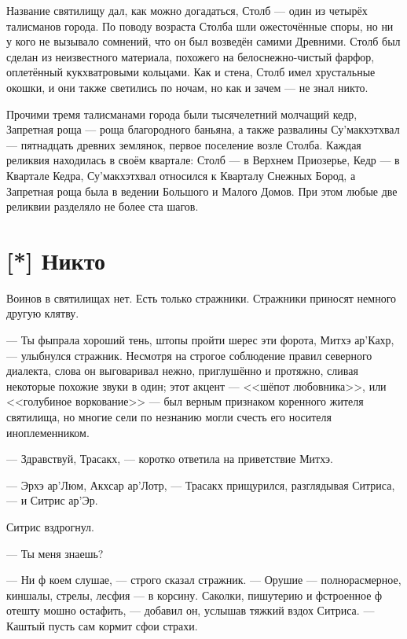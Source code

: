 Название святилищу дал, как можно догадаться, Столб --- один из четырёх талисманов города.
По поводу возраста Столба шли ожесточённые споры, но ни у кого не вызывало сомнений, что он был возведён самими Древними.
Столб был сделан из неизвестного материала, похожего на белоснежно-чистый фарфор, оплетённый кукхватровыми кольцами.
Как и стена, Столб имел хрустальные окошки, и они также светились по ночам, но как и зачем --- не знал никто\FM.

Прочими тремя талисманами города были тысячелетний молчащий кедр, Запретная роща --- роща благородного баньяна, а также развалины Су'макхэтхвал --- пятнадцать древних землянок, первое поселение возле Столба.
Каждая реликвия находилась в своём квартале: Столб --- в Верхнем Приозерье, Кедр --- в Квартале Кедра, Су'макхэтхвал относился к Кварталу Снежных Бород, а Запретная роща была в ведении Большого и Малого Домов.
При этом любые две реликвии разделяло не более ста шагов.

\section{[*] Никто}

Воинов в святилищах нет.
Есть только стражники.
Стражники приносят немного другую клятву.

--- Ты фыпрала хороший тень, штопы пройти шерес эти форота, Митхэ ар'Кахр, --- улыбнулся стражник.
Несмотря на строгое соблюдение правил северного диалекта, слова он выговаривал нежно, приглушённо и протяжно, сливая некоторые похожие звуки в один;
этот акцент --- <<шёпот любовника>>, или <<голубиное воркование>> --- был верным признаком коренного жителя святилища, но многие сели по незнанию могли счесть его носителя иноплеменником.

--- Здравствуй, Трасакх, --- коротко ответила на приветствие Митхэ.

--- Эрхэ ар'Люм, Акхсар ар'Лотр, --- Трасакх прищурился, разглядывая Ситриса, --- и Ситрис ар'Эр.

Ситрис вздрогнул.

--- Ты меня знаешь?

--- Ни ф коем слушае, --- строго сказал стражник.
--- Орушие --- полнорасмерное, киншалы, стрелы, лесфия --- в корсину.
Саколки, пишутерию и фстроенное ф отешту мошно остафить, --- добавил он, услышав тяжкий вздох Ситриса.
--- Каштый пусть сам кормит сфои страхи.

